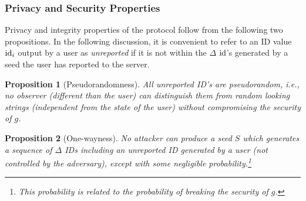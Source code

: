 \documentclass{article}
\newtheorem{proposition}{Proposition}
\begin{document}

\subsubsection{Privacy and Security Properties}

Privacy and integrity properties of the protocol follow from the following two propositions. In the following discussion, it is convenient to refer to an ID value $\mathrm{id}_i$ output by a user as {\em unreported} if it is not within the $\Delta$ $\mathrm{id}$'s generated by a seed the user has reported to the server. 

\begin{proposition}[Pseudorandomness]
   All unreported ID's are pseudorandom, i.e., no observer (different than the user) can distinguish them from random looking strings (independent from the state of the user) without compromising the security of $g$.
\end{proposition}

\begin{proposition}[One-wayness]
   No attacker can produce a seed $S$ which generates a sequence of $\Delta$ IDs including an unreported ID generated by a user (not controlled by the adversary), except with some negligible probability.\footnote{This probability is related to the probability of breaking the security of $g$.}
\end{proposition}
\end{document}
